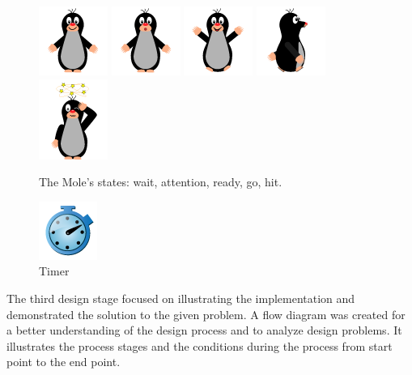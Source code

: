 \begin{figure}[h]  %
  \centering
  \includegraphics[width=.1\textwidth]{figures/MoleWait.png}
   \includegraphics[width=.1\textwidth]{figures/MoleAttention.png}
   \includegraphics[width=.1\textwidth]{figures/MoleJump.png}
   \includegraphics[width=.1\textwidth]{figures/MoleGo.png}
   \includegraphics[width=.1\textwidth]{figures/MoleKaBoom.png}
  \caption[Mole's states.]{ The Mole's states: wait, attention, ready, go, hit.}
  \label{fig:moleallstates}
\end{figure}

\begin{figure}[h]
  \centering
  \includegraphics[width=.1\textwidth]{figures/timer.png}
  \caption[Timer]{Timer}
\end{figure}


The third design stage focused on illustrating the implementation and demonstrated the solution to the given problem.
A flow diagram was created for a better understanding of the design process and to analyze design problems. It illustrates the process stages and the conditions during the process from start point to the end point. 

\break

